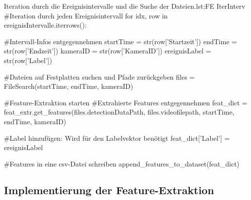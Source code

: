 \begin{pythoncode}{Iteration durch die Ereignisintervalle und die Suche der Dateien.}{lst:FE IterInterv}
#Iteration durch jeden Ereignisintervall
for idx, row in ereignisIntervalle.iterrows():

    #Intervall-Infos entgegennehmen
    startTime = str(row['Startzeit'])
    endTime = str(row['Endzeit'])
    kameraID = str(row['KameraID'])
    ereignisLabel = str(row['Label'])

    #Dateien auf Festplatten suchen und Pfade zurückgeben 
    files = FileSearch(startTime, endTime, kameraID)

    #Feature-Extraktion starten
    #Extrahierte Features entgegennehmen
    feat_dict = feat_extr.get_features(files.detectionDataPath, 
                                       files.videofilepath, 
                                       startTime, 
                                       endTime, 
                                       kameraID)

    #Label hinzufügen: Wird für den Labelvektor benötigt
    feat_dict['Label'] = ereignisLabel
    
    #Features in eine csv-Datei schreiben
    append_features_to_dataset(feat_dict)
\end{pythoncode}



\subsection{Implementierung der Feature-Extraktion} \label{sec:Umsets FeatExtrKlass}

